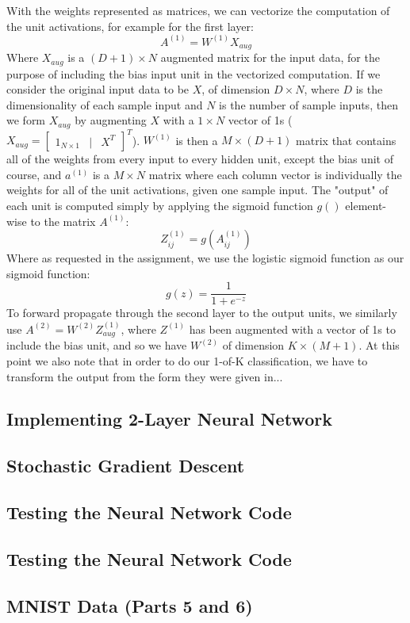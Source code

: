 \documentclass[10pt]{article}
\begin{document}
With the weights represented as matrices, we can vectorize the computation of the unit activations, for example for the first layer:
%
%
\begin{equation}
A^{(1)} = W^{(1)} X_{aug}
\end{equation}
%
%
Where $X_{aug}$ is a $(D+1) \times N$ augmented matrix for the input data, for the purpose of including the bias input unit in the vectorized computation.  If we consider the original input data to be $X$, of dimension $D \times N$, where $D$ is the dimensionality of each sample input and $N$ is the number of sample inputs, then we form $X_{aug}$ by augmenting $X$ with a $1 \times N$ vector of 1s ($X_{aug} = \begin{bmatrix} 1_{N \times 1} &| & X^T\end{bmatrix} ^T$).  $W^{(1)}$ is then a $M \times (D+1)$ matrix that contains all of the weights from every input to every hidden unit, except the bias unit of course, and $a^{(1)}$ is a $M \times N$ matrix where each column vector is individually the weights for all of the unit activations, given one sample input.  The "output" of each unit is computed simply by applying the sigmoid function $g()$ element-wise to the matrix $A^{(1)}$:
%
%
\begin{equation}
Z^{(1)}_{ij} = g(A^{(1)}_{ij})
\end{equation}
%
%
Where as requested in the assignment, we use the logistic sigmoid function as our sigmoid function:
%
%
\begin{equation}
g(z) = \frac{1}{1 + e^{-z}}
\end{equation}
%
%
To forward propagate through the second layer to the output units, we similarly use $A^{(2)} = W^{(2)} Z_{aug}^{(1)}$, where $Z^{(1)}$ has been augmented with a vector of 1s to include the bias unit, and so we have $W^{(2)}$ of dimension $K \times (M+1)$.  At this point we also note that in order to do our 1-of-K classification, we have to transform the output from the form they were given in...





\subsection*{Implementing 2-Layer Neural Network}

\subsection*{Stochastic Gradient Descent}

\subsection*{Testing the Neural Network Code}

\subsection*{Testing the Neural Network Code}

\subsection*{MNIST Data (Parts 5 and 6)}
\end{document}

